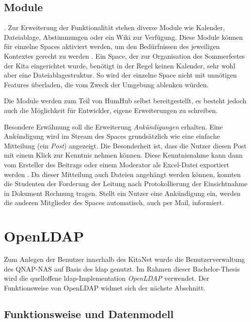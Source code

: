\subsection{Module}

 \citep[][]{modules}. 
Zur Erweiterung der Funktionalität stehen diverse Module wie Kalender, Dateiablage, Abstimmungen oder ein Wiki zur Verfügung.
Diese Module können für einzelne Spaces aktiviert werden, um den Bedürfnissen des jeweiligen Kontextes gerecht zu werden \citep[vgl.][f.]{modules}. Ein Space, der zur Organisation des Sommerfestes der Kita eingerichtet wurde, benötigt \zb in der Regel keinen Kalender, sehr wohl aber eine Dateiablagestruktur.
So wird der einzelne Space nicht mit unnötigen Features überladen, die vom Zweck der Umgebung ablenken würden. 

Die Module werden zum Teil von HumHub selbst bereitgestellt, es besteht jedoch auch die Möglichkeit für Entwickler, eigene Erweiterungen zu schreiben.

Besondere Erwähnung soll die Erweiterung \textit{Ankündigungen} erhalten. 
Eine Ankündigung wird im Stream des Spaces grundsätzlich wie eine einfache Mitteilung (ein \textit{Post}) angezeigt. 
Die Besonderheit ist, dass die Nutzer diesen Post mit einem Klick zur Kenntnis nehmen können. 
Diese Kenntnisnahme kann dann vom Ersteller des Beitrags oder einem Moderator \zb als Excel-Datei exportiert werden  \citep[vgl. Quellcode unter][]{announcement}. 
Da dieser Mitteilung auch Dateien angehängt werden können, konnten die Studenten der Forderung der Leitung nach Protokollierung der Einsichtnahme in Dokument Rechnung tragen.
Stellt ein Nutzer eine Ankündigung ein, werden die anderen Mitglieder des Spaces automatisch, auch per Mail, informiert.


\section{OpenLDAP}

Zum Anlegen der Benutzer innerhalb des KitaNet wurde die Benutzerverwaltung des QNAP-NAS auf Basis des \acf{ldap} genutzt. Im Rahmen dieser Bachelor-Thesis wird die quelloffene \ac{ldap}-Implementation \textit{OpenLDAP} verwendet. Der Funktionsweise von OpenLDAP widmet sich der nächste Abschnitt.

\subsection{Funktionsweise und Datenmodell}

